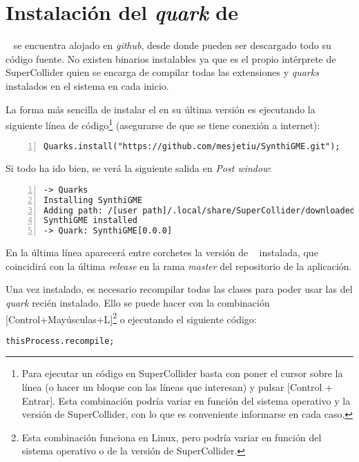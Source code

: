 \section{Instalación del \textit{quark} de \appName}

\appName~ se encuentra alojado en \textit{github}, desde donde pueden ser descargado todo su código fuente. No existen binarios instalables ya que es el propio intérprete de SuperCollider quien se encarga de compilar todas las extensiones y \textit{quarks} instalados en el sistema en cada inicio.

La forma más sencilla de instalar el \appName en su última versión es ejecutando la siguiente línea de código\footnote{Para ejecutar un código en SuperCollider basta con poner el cursor sobre la línea (o hacer un bloque con las líneas que interesan) y pulsar [Control + Entrar]. Esta combinación podría variar en función del sistema operativo y la versión de SuperCollider, con lo que es conveniente informarse en cada caso.} (asegurarse de que se tiene conexión a internet):

\begin{lstlisting}[style=SuperCollider-IDE, frame=single, numbers=left]
Quarks.install("https://github.com/mesjetiu/SynthiGME.git");
\end{lstlisting}

Si todo ha ido bien, se verá la siguiente salida en \textit{Post window}:

\begin{lstlisting}[frame=single, numbers=left]
-> Quarks
Installing SynthiGME
Adding path: /[user path]/.local/share/SuperCollider/downloaded-quarks/SynthiGME
SynthiGME installed
-> Quark: SynthiGME[0.0.0]
\end{lstlisting}

En la última línea aparecerá entre corchetes la versión de \appName~ instalada, que coincidirá con la última \textit{release} en la rama \textit{master} del repositorio de la aplicación.

Una vez instalado, es necesario recompilar todas las clases para poder usar las del \textit{quark} recién instalado. Ello se puede hacer con la combinación [Control+Mayúsculas+L]\footnote{Esta combinación funciona en Linux, pero podría variar en función del sistema operativo o de la versión de SuperCollider.} o ejecutando el siguiente código:

\begin{lstlisting}[style=SuperCollider-IDE, frame=single]
thisProcess.recompile;
\end{lstlisting}


